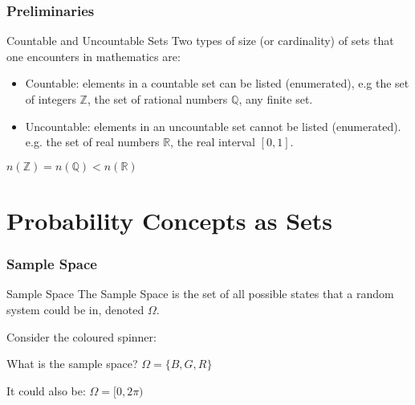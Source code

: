 \documentclass{beamer}
\begin{document}
\begin{frame}
  \frametitle{Preliminaries}
  \begin{block}{Countable and Uncountable Sets}
    Two types of size (or cardinality) of sets that one encounters in mathematics are:
    \begin{itemize}
      \item Countable: elements in a countable set can be listed (enumerated), e.g the set of integers $\mathbb{Z}$, the set of rational numbers $\mathbb{Q}$, any finite set.
      \item Uncountable: elements in an uncountable set cannot be listed (enumerated). e.g. the set of real numbers $\mathbb{R}$, the real interval $[0,1]$.
    \end{itemize}
    \begin{center}
      $n(\mathbb{Z}) = n(\mathbb{Q}) < n(\mathbb{R})$
    \end{center}

  \end{block}
\end{frame}


\section{Probability Concepts as Sets}


\begin{frame}
  \frametitle{Sample Space}
  \begin{block}{Sample Space \parencite[p.~192]{measure_tao}}
    The Sample Space is the set of all possible states that a random system could be in, denoted $\Omega$.
  \end{block}
  \begin{example}
    Consider the coloured spinner:
    \begin{center}
    \end{center}
    What is the sample space?
    \pause
    $\Omega = \{B, G, R\}$

    \pause
    It could also be: $\Omega = [0, 2\pi)$
  \end{example}
\end{frame}
\end{document}
